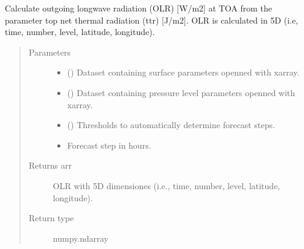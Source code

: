 \documentclass[a4paper,11pt,english]{sphinxmanual}
\begin{document}

\begin{fulllineitems}
\label{\detokenize{modules:envlib.processing_surf_vars.get_olr_5d}}
Calculate outgoing longwave radiation (OLR) {[}W/m2{]} at TOA from the parameter top net thermal radiation (ttr)
{[}J/m2{]}. OLR is calculated in 5D (i.e, time, number, level, latitude, longitude).
\begin{quote}\begin{description}
\item[{Parameters}] \leavevmode\begin{itemize}
\item {} 
 () \textendash{} Dataset containing surface parameters openned with xarray.

\item {} 
 () \textendash{} Dataset containing pressure level parameters openned with xarray.

\item {} 
 () \textendash{} Thresholds to automatically determine forecast steps.

\item {} 
 \textendash{} Forecast step in hours.

\end{itemize}

\item[{Returns arr}] \leavevmode
OLR with 5D dimensiones (i.e., time, number, level, latitude, longitude).

\item[{Return type}] \leavevmode
numpy.ndarray

\end{description}\end{quote}

\end{fulllineitems}
\end{document}
